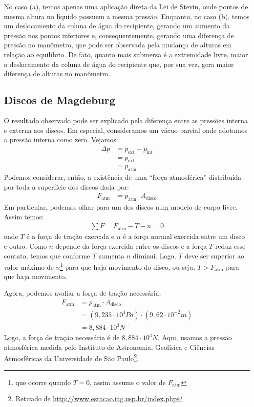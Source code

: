 No caso (a), temos apenas uma aplicação direta da Lei de Stevin, onde pontos de
mesma altura no líquido possuem a mesma pressão. Enquanto, no caso (b), temos um
deslocamento da coluna de água do recipiente, gerando um aumento da pressão nos
pontos inferiores e, consequentemente, gerando uma diferença de pressão no
manômetro, que pode ser observada pela mudança de alturas em relação ao
equilíbrio. De fato, quanto mais submersa é a extremidade livre, maior o
deslocamento da coluna de água do recipiente que, por sua vez, gera maior
diferença de alturas no manômetro.

\subsection{Discos de Magdeburg}

O resultado observado pode ser explicado pela diferença entre as pressões
interna e externa aos discos. Em especial, consideramos um vácuo parcial onde
adotamos a pressão interna como zero. Vejamos:
\begin{align*}
    \Delta p &= p_{\text{ext}} - p_{\text{int}}\\
    &= p_{\text{ext}}\\
    &= p_{\text{atm}}
\end{align*}
Podemos considerar, então, a existência de uma ``força atmosférica'' distribuída
por toda a superfície dos discos dada por:
\begin{align*}
    F_{\text{atm}} &= p_{\text{atm}} \cdot A_{\text{disco}}
\end{align*}
Em particular, podemos olhar para um dos discos num modelo de corpo livre.
Assim temos:
\begin{align*}
    \sum F = F_{\text{atm}} - T - n = 0
\end{align*}
onde \( T \) é a força de tração exercida e \( n \) é a força normal exercida
entre um disco e outro. Como \( n \) depende da força exercida entre os
discos e a força \( T \) reduz esse contato, temos que conforme \( T \) aumenta
\( n \) diminui. Logo, \( T \) deve ser superior ao valor máximo de \( n
\)\footnote{que ocorre quando \( T=0 \), assim assume o valor de
\(F_{\text{atm}}\)} para que haja movimento do disco, ou seja, 
\( T > F_{\text{atm}} \) para que haja movimento.

Agora, podemos avaliar a força de tração necessária:
\begin{align*}
    F_{\text{atm}} &= p_{\text{atm}} \cdot A_{\text{disco}}\\
    &= (9,235 \cdot 10^4 \unit{Pa}) \cdot (9,62 \cdot 10^{-2} \unit{m})\\
    &= 8,884 \cdot 10^3 \unit{N}
\end{align*}
Logo, a força de tração necessária é de \( 8,884 \cdot 10^3 \unit{N} \). 
Aqui, usamos a pressão atmosférica medida pelo Instituto de Astronomia,
Geofísica e Ciências Atmosféricas da Universidade de São Paulo\footnote{Retirado
de \url{http://www.estacao.iag.usp.br/index.php}}.

